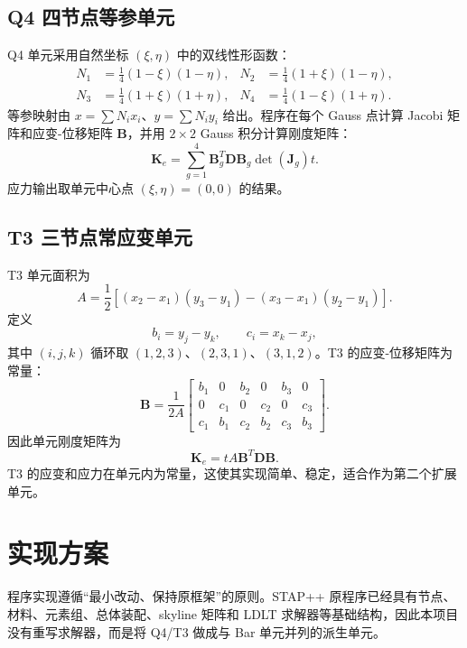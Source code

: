﻿\documentclass[UTF8,11pt,a4paper]{ctexart}
\begin{document}
\subsection{Q4 四节点等参单元}
Q4 单元采用自然坐标 $(\xi,\eta)$ 中的双线性形函数：
\begin{align}
N_1&=\frac14(1-\xi)(1-\eta), & N_2&=\frac14(1+\xi)(1-\eta),\\
N_3&=\frac14(1+\xi)(1+\eta), & N_4&=\frac14(1-\xi)(1+\eta).
\end{align}
等参映射由 $x=\sum N_i x_i$、$y=\sum N_i y_i$ 给出。程序在每个 Gauss 点计算 Jacobi 矩阵和应变-位移矩阵 $\bm B$，并用 $2\times2$ Gauss 积分计算刚度矩阵：
\begin{equation}
\bm K_e=\sum_{g=1}^{4}\bm B_g^T\bm D\bm B_g\det(\bm J_g)t.
\end{equation}
应力输出取单元中心点 $(\xi,\eta)=(0,0)$ 的结果。

\subsection{T3 三节点常应变单元}
T3 单元面积为
\begin{equation}
A=\frac12[(x_2-x_1)(y_3-y_1)-(x_3-x_1)(y_2-y_1)].
\end{equation}
定义
\begin{equation}
b_i=y_j-y_k,\qquad c_i=x_k-x_j,
\end{equation}
其中 $(i,j,k)$ 循环取 $(1,2,3)$、$(2,3,1)$、$(3,1,2)$。T3 的应变-位移矩阵为常量：
\begin{equation}
\bm B=\frac{1}{2A}
\begin{bmatrix}
b_1&0&b_2&0&b_3&0\\
0&c_1&0&c_2&0&c_3\\
c_1&b_1&c_2&b_2&c_3&b_3
\end{bmatrix}.
\end{equation}
因此单元刚度矩阵为
\begin{equation}
\bm K_e=tA\bm B^T\bm D\bm B.
\end{equation}
T3 的应变和应力在单元内为常量，这使其实现简单、稳定，适合作为第二个扩展单元。

\section{实现方案}
程序实现遵循“最小改动、保持原框架”的原则。STAP++ 原程序已经具有节点、材料、元素组、总体装配、skyline 矩阵和 LDLT 求解器等基础结构，因此本项目没有重写求解器，而是将 Q4/T3 做成与 Bar 单元并列的派生单元。
\end{document}
